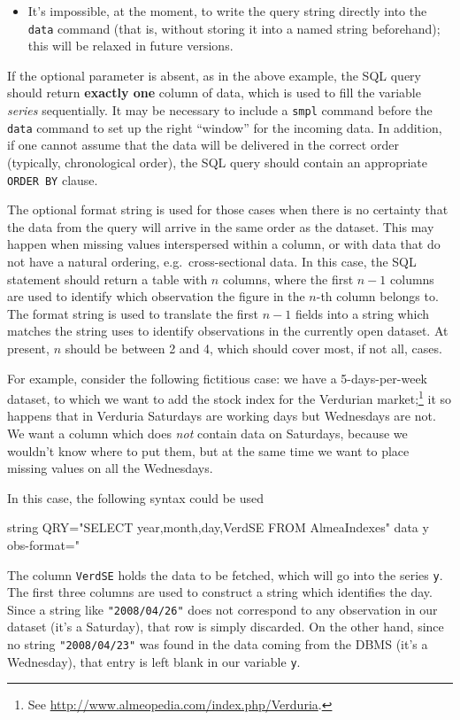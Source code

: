 \begin{itemize}
  \item It's impossible, at the moment, to write the query string
    directly into the \texttt{data} command (that is, without storing
    it into a named string beforehand); this will be relaxed in future
    versions.
\end{itemize}

If the optional parameter is absent, as in the above example, the SQL
query should return \textbf{exactly one} column of data, which is used
to fill the variable \emph{series} sequentially.  It may be necessary
to include a \texttt{smpl} command before the \texttt{data} command to
set up the right ``window'' for the incoming data.  In addition, if
one cannot assume that the data will be delivered in the correct order
(typically, chronological order), the SQL query should contain an
appropriate \texttt{ORDER BY} clause.

The optional format string is used for those cases when there is no
certainty that the data from the query will arrive in the same order
as the  dataset. This may happen when missing
values interspersed within a column, or with data that do not have a
natural ordering, e.g.\ cross-sectional data. In this case,
the SQL statement should return a table with $n$ columns, where the
first $n-1$ columns are used to identify which observation the figure
in the $n$-th column belongs to. The format string is used to
translate the first $n-1$ fields into a string which matches the
string  uses to identify observations in the currently open
dataset. At present, $n$ should be between 2 and 4, which should cover
most, if not all, cases.

For example, consider the following fictitious case: we have a
5-days-per-week dataset, to which we want to add the stock index for
the Verdurian market;\footnote{See
  \url{http://www.almeopedia.com/index.php/Verduria}.} it so
happens that in Verduria Saturdays are working days but Wednesdays are
not. We want a column which does \emph{not} contain data on
Saturdays, because we wouldn't know where to put them, but at the same
time we want to place missing values on all the Wednesdays.

In this case, the following syntax could be used
%
\begin{code}
  string QRY="SELECT year,month,day,VerdSE FROM AlmeaIndexes"
  data y obs-format="%
\end{code}
%
The column \texttt{VerdSE} holds the data to be fetched, which will go
into the  series \texttt{y}. The first three columns are
used to construct a string which identifies the day. Since a string
like \texttt{"2008/04/26"} does not correspond to any observation in
our dataset (it's a Saturday), that row is simply discarded. On the
other hand, since no string \texttt{"2008/04/23"} was found in the
data coming from the DBMS (it's a Wednesday), that entry is left blank
in our variable \texttt{y}.

